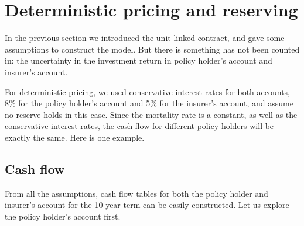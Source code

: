 \documentclass{report}
\begin{document}
\section{Deterministic pricing and reserving}

In the previous section we introduced the unit-linked contract, and gave some assumptions to construct the model. But there is something has not been counted in: the uncertainty in the investment return in policy holder's account and insurer's account. 

For deterministic pricing, we used conservative interest rates for both accounts, 8\% for the policy holder's account and 5\% for the insurer's account, and assume no reserve holds in this case. Since the mortality rate is a constant, as well as the conservative interest rates, the cash flow for different policy holders will be exactly the same. Here is one example.

\subsection{Cash flow}

From all the assumptions, cash flow tables for both the policy holder and insurer's account for the  10 year term can be easily constructed. Let us explore the policy holder's account first. 
\end{document}

